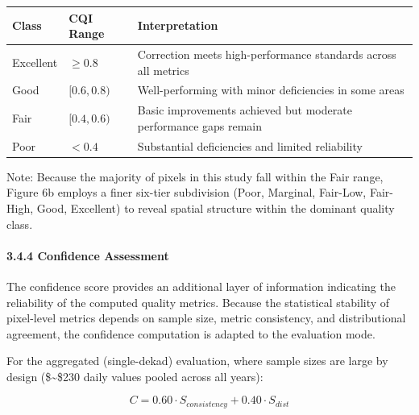 \documentclass[
]{article}
\begin{document}
\begin{longtable}[]{@{}
  >{\centering\arraybackslash}p{}
  >{\centering\arraybackslash}p{}
  >{\raggedright\arraybackslash}p{}@{}}
\toprule\noalign{}
\begin{minipage}[b]{\linewidth}\centering
Class
\end{minipage} & \begin{minipage}[b]{\linewidth}\centering
CQI Range
\end{minipage} & \begin{minipage}[b]{\linewidth}\raggedright
Interpretation
\end{minipage} \\
\midrule\noalign{}
\endhead
\bottomrule\noalign{}
\endlastfoot
Excellent & \(\geq 0.8\) & Correction meets high-performance standards
across all metrics \\
Good & \([0.6, 0.8)\) & Well-performing with minor deficiencies in some
areas \\
Fair & \([0.4, 0.6)\) & Basic improvements achieved but moderate
performance gaps remain \\
Poor & \(< 0.4\) & Substantial deficiencies and limited reliability \\
\end{longtable}

Note: Because the majority of pixels in this study fall within the Fair
range, Figure 6b employs a finer six-tier subdivision (Poor, Marginal,
Fair-Low, Fair-High, Good, Excellent) to reveal spatial structure within
the dominant quality class.

\paragraph{3.4.4 Confidence Assessment}\label{confidence-assessment}

The confidence score provides an additional layer of information
indicating the reliability of the computed quality metrics. Because the
statistical stability of pixel-level metrics depends on sample size,
metric consistency, and distributional agreement, the confidence
computation is adapted to the evaluation mode.

For the aggregated (single-dekad) evaluation, where sample sizes are
large by design (\$\sim\$230 daily values pooled across all years):

\[C = 0.60 \cdot S_{consistency} + 0.40 \cdot S_{dist}\]
\end{document}
